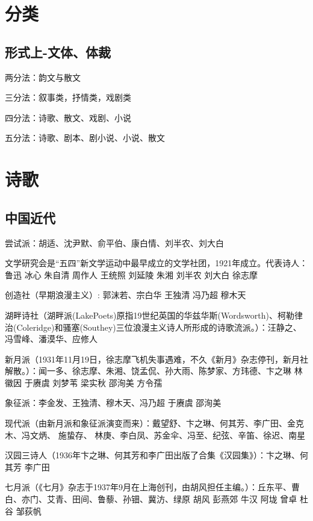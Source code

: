 \documentclass[UTF8]{../../RepresentationUniverse}
\begin{document}
\chapter{分类}

\section{形式上-文体、体裁}

两分法：韵文与散文

三分法：叙事类，抒情类，戏剧类

四分法：诗歌、散文、戏剧、小说

五分法：诗歌、剧本、剧小说、小说、散文



\chapter{诗歌}


\section{中国近代}


尝试派：胡适、沈尹默、俞平伯、康白情、刘半农、刘大白


文学研究会是“五四”新文学运动中最早成立的文学社团，1921年成立。代表诗人： 鲁迅 冰心 朱自清 周作人 王统照 刘延陵 朱湘 刘半农 刘大白 徐志摩


创造社（早期浪漫主义）: 郭沫若、宗白华 王独清 冯乃超 穆木天


湖畔诗社（湖畔派(LakePoets)原指19世纪英国的华兹华斯(Wordsworth)、柯勒律治(Coleridge)和骚塞(Southey)三位浪漫主义诗人所形成的诗歌流派。）：汪静之、冯雪峰、潘漠华、应修人



新月派（1931年11月19日，徐志摩飞机失事遇难，不久《新月》杂志停刊，新月社解散。）：闻一多、徐志摩、朱湘、饶孟侃、孙大雨、陈梦家、方玮德、卞之琳 林徽因 于赓虞 刘梦苇 梁实秋   邵洵美  方令孺 


象征派：李金发、王独清、穆木天、冯乃超 于赓虞 邵洵美



现代派（由新月派和象征派演变而来）：戴望舒、卞之琳、何其芳、李广田、金克木、冯文炳、 施蛰存、 林庚、李白凤、苏金伞、冯至、纪弦、辛笛、徐迟、南星


汉园三诗人（1936年卞之琳、何其芳和李广田出版了合集《汉园集》）：卞之琳、何其芳 李广田



七月派（《七月》杂志于1937年9月在上海创刊，由胡风担任主编。）：丘东平、曹白、亦门、艾青、田间、鲁藜、孙钿、冀汸、绿原 胡风  彭燕郊 牛汉   阿垅 曾卓 杜谷 邹荻帆
\end{document}

